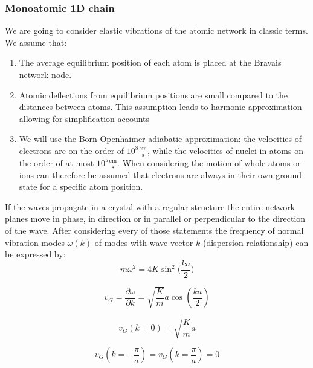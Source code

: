 \subsubsection*{Monoatomic 1D chain}

We are going to consider elastic vibrations of the atomic network in classic
terms. We assume that:
\begin{enumerate}
\item The average equilibrium position of each atom is placed at the Bravais 
        network node.
\item Atomic deflections from equilibrium positions are small compared to the
        distances between atoms. This assumption leads to harmonic 
        approximation allowing for simplification accounts
\item We will use the Born-Openhaimer adiabatic approximation: the velocities
        of electrons are on the order of $10^8 \mathrm{\frac{cm}{s}}$, while 
        the velocities of nuclei in atoms on the order of at most $10^5 \mathrm
        {\frac{cm}{s}}$. When considering the motion of whole atoms or ions can 
        therefore be assumed that electrons are always in their own
        ground state for a specific atom position.
\end{enumerate}
If the waves propagate in a crystal with a regular structure the entire network planes move in phase, in direction or in parallel or perpendicular to the direction of the wave. After considering every of those statements the frequency of normal vibration modes
$\omega(k)$ of modes with wave vector $k$ (dispersion relationship) can be expressed by:
\begin{equation}
    m\omega^2 = 4K \sin^2\bigg(\frac{ka}{2}\bigg)  
\end{equation}

$$v_G = \frac{\partial \omega}{\partial k} = 
     \sqrt{\frac{K}{m}} a \cos\left(\frac{ka}{2} \right)$$

$$v_G(k=0) = \sqrt{\frac{K}{m}} a$$

$$v_G\left(k=-\frac{\pi}{a}\right)= v_G\left(k=\frac{\pi}{a}\right) = 0$$